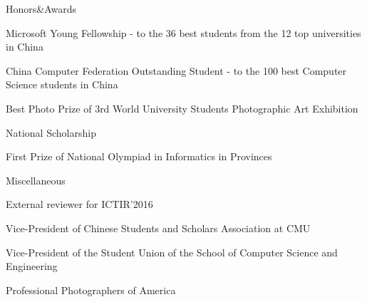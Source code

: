 \documentclass{resume} %
\begin{document}
\begin{rSection}{Honors\&Awards}
\begin{rSubsection}{}{}{}{}
\item Microsoft Young Fellowship - to the 36 best students from the 12 top universities in China
\item China Computer Federation Outstanding Student - to the 100 best Computer Science students in China
\item Best Photo Prize of 3rd World University Students Photographic Art Exhibition
\item National Scholarship
\item First Prize of National Olympiad in Informatics in Provinces 
\end{rSubsection}
\end{rSection}

\begin{rSection}{Miscellaneous}
\begin{rSubsection}{}{}{}{}
\item External reviewer for ICTIR'2016
\item Vice-President of Chinese Students and Scholars Association at CMU
\item Vice-President of the Student Union of the School of Computer Science and Engineering
\item Professional Photographers of America
\end{rSubsection}
\end{rSection}
\end{document}
